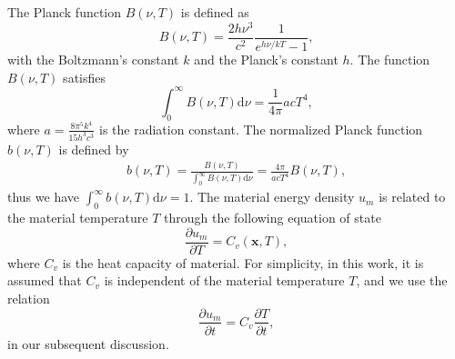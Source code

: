 \documentclass[preprint,12pt]{elsarticle}
\theoremstyle{definition}
\theoremstyle{plain}
\numberwithin{equation}{section}
\numberwithin{algorithm}{section}
\newcounter{eq_count}
\newcommand{\vx}{\mathbf{x}}
\newcommand{\dd}{{\text{d}}}
\newcommand{\pdrv}[2]{\frac{\partial{#1}}{\partial{#2}}}
\begin{document}
The Planck function $B(\nu,T) $ is defined as
    \begin{equation}\label{eq_def_PlanckFunc}
		B(\nu, T)=\frac{2 h \nu^3}{c^2} \frac{1}{e^{h \nu / k T}-1},
    \end{equation}
with the Boltzmann’s constant $k$  and the Planck’s constant $h$. The function $B(\nu,T) $ satisfies
\begin{equation}
    \int_0^{\infty} B(\nu,T) \dd{\nu} = \frac{1}{4\pi}acT^4,
\end{equation}
where $a = \frac{8 \pi^5 k^4}{15h^3c^3}$ is the radiation constant. The normalized Planck function $b(\nu,T)$
is defined by 
    \begin{equation}\label{eq_def_b}
		\begin{aligned}
			b(\nu, T)  =\frac{B(\nu, T)}{\int_0^{\infty} B(\nu, T) \dd{\nu}} = \frac{4 \pi}{ac T^4}B(\nu, T) ,
		\end{aligned}
    \end{equation}
thus we have $\int_0^{\infty} b(\nu,T) \dd{\nu} = 1$. The material energy density $u_m $ is related to the material temperature $T$ through the following equation of state
\begin{equation*}
    \pdrv{u_m}{T} = C_v(\vx,T),
\end{equation*}
where $C_v$ is the heat capacity of material. For simplicity, in this work, it is assumed  that $C_v$ is independent of the material temperature $T$, and we use the relation 
\begin{equation*}
    \pdrv{u_m}{t} = C_v \pdrv{T}{t},
\end{equation*}
in our subsequent discussion.
\end{document}
